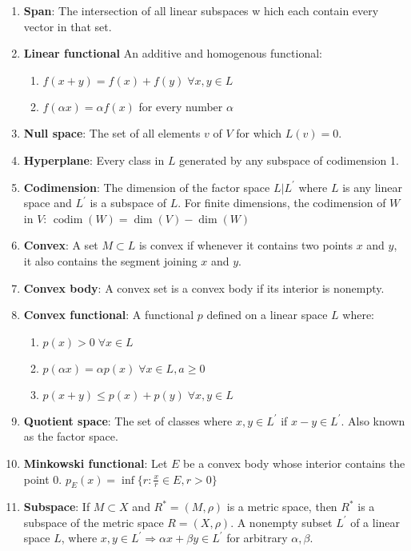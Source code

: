 \documentclass[5pt,letterpaper,reqno]{amsart}
\begin{document}
\begin{enumerate}[1.]
\item \textbf{Span}: The intersection of all linear subspaces w hich each contain every vector in that set.
\item \textbf{Linear functional} An additive and homogenous functional:
    \begin{enumerate}
        \item $f(x+y) = f(x) + f(y) \; \forall x, y \in L$
        \item $f(\alpha x) = \alpha f(x)$ for every number $\alpha$
    \end{enumerate}
\item \textbf{Null space}: The set of all elements $v$ of $V$ for which $L(v) = 0$.
\item \textbf{Hyperplane}: Every class in $L$ generated by any subspace of codimension 1.
\item \textbf{Codimension}: The dimension of the factor space $L|L^\prime$ where $L$ is any linear space and $L^\prime$ is a subspace of $L$. For finite dimensions, the codimension of $W$ in $V$: $\operatorname { codim } ( W ) = \operatorname { dim } ( V ) - \operatorname { dim } ( W )$
\item \textbf{Convex}: A set $M \subset L$ is convex if whenever it contains two points $x$ and $y$, it also contains the segment joining $x$ and $y$.
\item \textbf{Convex body}: A convex set is a convex body if its interior is nonempty.
\item \textbf{Convex functional}: A functional $p$ defined on a linear space $L$ where:
    \begin{enumerate}
        \item $p(x) > 0 \; \forall x \in L$
        \item $p(\alpha x) = \alpha p(x) \; \forall x \in L, a \geq 0$
        \item $p(x+y) \leq p(x) + p(y) \; \forall x,y \in L$
    \end{enumerate}
\item \textbf{Quotient space}: The set of classes where $x,y \in L^\prime$ if $x-y \in L^\prime$. Also known as the factor space.
\item \textbf{Minkowski functional}: Let $E$ be a convex body whose interior contains the point 0.
    $p_E(x) = \inf\{r: \frac{x}{r} \in E, r > 0\}$
\item \textbf{Subspace}: If $M \subset X$ and $R^* = (M, \rho)$ is a metric space, then $R^*$ is a subspace of the metric space $R = (X, \rho)$. A nonempty subset $L^\prime$ of a linear space $L$, where $x, y \in L^\prime \Rightarrow \alpha x + \beta y \in L^\prime$ for arbitrary $\alpha, \beta$.

\end{enumerate}
\end{document}
